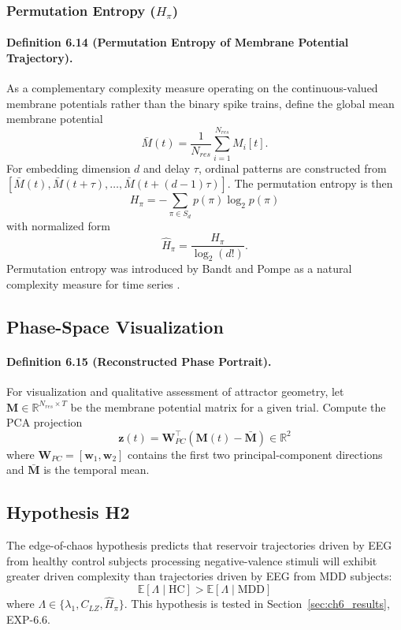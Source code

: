 \subsubsection{Permutation Entropy ($H_{\pi}$)}

\paragraph{Definition 6.14 (Permutation Entropy of Membrane Potential Trajectory).}
As a complementary complexity measure operating on the continuous-valued membrane potentials rather than the binary spike trains, define the global mean membrane potential
\begin{equation}
\bar{M}(t)=\frac{1}{N_{res}}\sum_{i=1}^{N_{res}} M_i[t].
\end{equation}
For embedding dimension $d$ and delay $\tau$, ordinal patterns are constructed from $[\bar{M}(t),\bar{M}(t+\tau),\ldots,\bar{M}(t+(d-1)\tau)]$. The permutation entropy is then
\begin{equation}
H_{\pi}=-\sum_{\pi\in S_d} p(\pi)\log_2 p(\pi)
\end{equation}
with normalized form
\begin{equation}
\hat{H}_{\pi}=\frac{H_{\pi}}{\log_2(d!)}.
\end{equation}
Permutation entropy was introduced by Bandt and Pompe as a natural complexity measure for time series \cite{bandt_permutation_2002}.

\subsection{Phase-Space Visualization}

\paragraph{Definition 6.15 (Reconstructed Phase Portrait).}
For visualization and qualitative assessment of attractor geometry, let $\mathbf{M} \in \mathbb{R}^{N_{res}\times T}$ be the membrane potential matrix for a given trial. Compute the PCA projection
\begin{equation}
\mathbf{z}(t)=\mathbf{W}_{PC}^{\top}(\mathbf{M}(t)-\bar{\mathbf{M}}) \in \mathbb{R}^{2}
\end{equation}
where $\mathbf{W}_{PC}=[\mathbf{w}_1,\mathbf{w}_2]$ contains the first two principal-component directions and $\bar{\mathbf{M}}$ is the temporal mean.

\subsection{Hypothesis H2}
The edge-of-chaos hypothesis predicts that reservoir trajectories driven by EEG from healthy control subjects processing negative-valence stimuli will exhibit greater driven complexity than trajectories driven by EEG from MDD subjects:
\begin{equation}
\mathbb{E}[\Lambda\mid \mathrm{HC}] > \mathbb{E}[\Lambda\mid \mathrm{MDD}]
\end{equation}
where $\Lambda \in \{\lambda_1,C_{LZ},\hat{H}_{\pi}\}$. This hypothesis is tested in Section~\ref{sec:ch6_results}, EXP-6.6.

